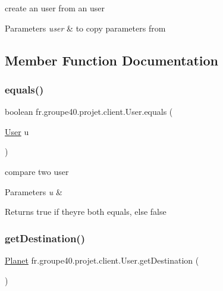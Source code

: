 create an user from an user 


\begin{DoxyParams}{Parameters}
{\em user} & to copy parameters from \\
\hline
\end{DoxyParams}


\subsection{Member Function Documentation}
\mbox{\label{classfr_1_1groupe40_1_1projet_1_1client_1_1_user_a9ef8e41efa22dad7be2e4b9966ff7818}} 
\subsubsection{\texorpdfstring{equals()}{equals()}}
{\footnotesize\ttfamily boolean fr.\+groupe40.\+projet.\+client.\+User.\+equals (\begin{DoxyParamCaption}\item[{\hyperlink{classfr_1_1groupe40_1_1projet_1_1client_1_1_user}{User}}]{u }\end{DoxyParamCaption})}



compare two user 


\begin{DoxyParams}{Parameters}
{\em u} & \\
\hline
\end{DoxyParams}
\begin{DoxyReturn}{Returns}
true if they\textquotesingle{}re both equals, else false 
\end{DoxyReturn}
\mbox{\label{classfr_1_1groupe40_1_1projet_1_1client_1_1_user_a1a8f8f74a34b5e4745f23089a223f6d6}} 
\subsubsection{\texorpdfstring{get\+Destination()}{getDestination()}}
{\footnotesize\ttfamily \hyperlink{classfr_1_1groupe40_1_1projet_1_1model_1_1planets_1_1_planet}{Planet} fr.\+groupe40.\+projet.\+client.\+User.\+get\+Destination (\begin{DoxyParamCaption}{ }\end{DoxyParamCaption})}

